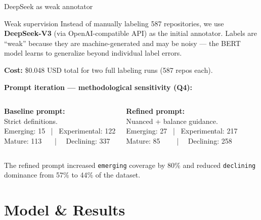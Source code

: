 \begin{frame}{DeepSeek as weak annotator}

  \begin{bluebox}{Weak supervision}
    Instead of manually labeling 587 repositories, we use \textbf{DeepSeek-V3}
    (via OpenAI-compatible API) as the initial annotator. Labels are ``weak''
    because they are machine-generated and may be noisy — the BERT model
    learns to generalize beyond individual label errors.
  \end{bluebox}

  \bigskip
  \textbf{Cost:} \$0.048 USD total for two full labeling runs (587 repos each).

  \bigskip
  \textbf{Prompt iteration — methodological sensitivity (Q4):}

  \vspace{0.3em}
  \begin{columns}
    \textbf{Baseline prompt:}\\
    Strict definitions.\\[0.3em]
    \small Emerging: 15 \ | \ Experimental: 122 \\
    Mature: 113 \ \ \ | \ \ Declining: 337

    \textbf{Refined prompt:}\\
    Nuanced + balance guidance.\\[0.3em]
    \small Emerging: 27 \ | \ Experimental: 217 \\
    Mature: 85 \ \ \ \ | \ \ Declining: 258
  \end{columns}

  \bigskip
  \small The refined prompt increased \texttt{emerging} coverage by 80\% and reduced
  \texttt{declining} dominance from 57\% to 44\% of the dataset.

\end{frame}

\section{Model \& Results}

